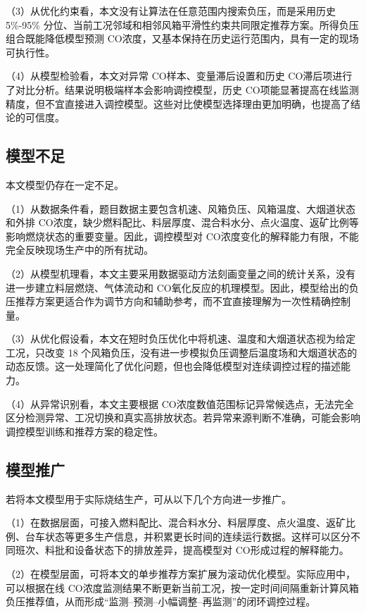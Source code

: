 \documentclass[UTF8,a4paper,zihao=-4]{ctexart}
\newcommand{\CO}{CO}
\begin{document}
（3）从优化约束看，本文没有让算法在任意范围内搜索负压，而是采用历史 5\%-95\% 分位、当前工况邻域和相邻风箱平滑性约束共同限定推荐方案。所得负压组合既能降低模型预测 \CO 浓度，又基本保持在历史运行范围内，具有一定的现场可执行性。

（4）从模型检验看，本文对异常 \CO 样本、变量滞后设置和历史 \CO 滞后项进行了对比分析。结果说明极端样本会影响调控模型，历史 \CO 项能显著提高在线监测精度，但不宜直接进入调控模型。这些对比使模型选择理由更加明确，也提高了结论的可信度。

\subsection{模型不足}

本文模型仍存在一定不足。

（1）从数据条件看，题目数据主要包含机速、风箱负压、风箱温度、大烟道状态和外排 \CO 浓度，缺少燃料配比、料层厚度、混合料水分、点火温度、返矿比例等影响燃烧状态的重要变量。因此，调控模型对 \CO 浓度变化的解释能力有限，不能完全反映现场生产中的所有扰动。

（2）从模型机理看，本文主要采用数据驱动方法刻画变量之间的统计关系，没有进一步建立料层燃烧、气体流动和 \CO 氧化反应的机理模型。因此，模型给出的负压推荐方案更适合作为调节方向和辅助参考，而不宜直接理解为一次性精确控制量。

（3）从优化假设看，本文在短时负压优化中将机速、温度和大烟道状态视为给定工况，只改变 18 个风箱负压，没有进一步模拟负压调整后温度场和大烟道状态的动态反馈。这一处理简化了优化问题，但也会降低模型对连续调控过程的描述能力。

（4）从异常识别看，本文主要根据 \CO 浓度数值范围标记异常候选点，无法完全区分检测异常、工况切换和真实高排放状态。若异常来源判断不准确，可能会影响调控模型训练和推荐方案的稳定性。

\subsection{模型推广}

若将本文模型用于实际烧结生产，可从以下几个方向进一步推广。

（1）在数据层面，可接入燃料配比、混合料水分、料层厚度、点火温度、返矿比例、台车状态等更多生产信息，并积累更长时间的连续运行数据。这样可以区分不同班次、料批和设备状态下的排放差异，提高模型对 \CO 形成过程的解释能力。

（2）在模型层面，可将本文的单步推荐方案扩展为滚动优化模型。实际应用中，可以根据在线 \CO 浓度监测结果不断更新当前工况，按一定时间间隔重新计算风箱负压推荐值，从而形成“监测--预测--小幅调整--再监测”的闭环调控过程。
\end{document}
